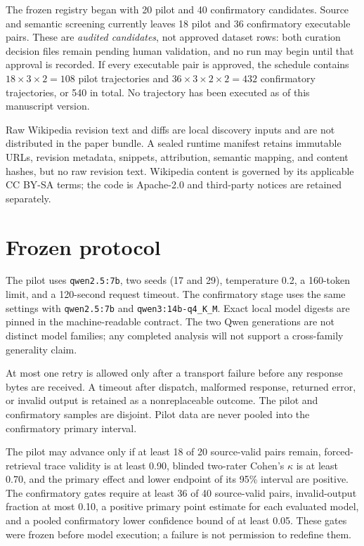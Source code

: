 \documentclass[11pt]{article}
\begin{document}
The frozen registry began with 20 pilot and 40 confirmatory candidates. Source and semantic screening currently leaves 18 pilot and 36 confirmatory executable pairs. These are \emph{audited candidates}, not approved dataset rows: both curation decision files remain pending human validation, and no run may begin until that approval is recorded. If every executable pair is approved, the schedule contains $18\times3\times2=108$ pilot trajectories and $36\times3\times2\times2=432$ confirmatory trajectories, or 540 in total. No trajectory has been executed as of this manuscript version.

Raw Wikipedia revision text and diffs are local discovery inputs and are not distributed in the paper bundle. A sealed runtime manifest retains immutable URLs, revision metadata, snippets, attribution, semantic mapping, and content hashes, but no raw revision text. Wikipedia content is governed by its applicable CC BY-SA terms; the code is Apache-2.0 and third-party notices are retained separately.

\section{Frozen protocol}

The pilot uses \texttt{qwen2.5:7b}, two seeds (17 and 29), temperature 0.2, a 160-token limit, and a 120-second request timeout. The confirmatory stage uses the same settings with \texttt{qwen2.5:7b} and \texttt{qwen3:14b-q4\_K\_M}. Exact local model digests are pinned in the machine-readable contract. The two Qwen generations are not distinct model families; any completed analysis will not support a cross-family generality claim.

At most one retry is allowed only after a transport failure before any response bytes are received. A timeout after dispatch, malformed response, returned error, or invalid output is retained as a nonreplaceable outcome. The pilot and confirmatory samples are disjoint. Pilot data are never pooled into the confirmatory primary interval.

The pilot may advance only if at least 18 of 20 source-valid pairs remain, forced-retrieval trace validity is at least 0.90, blinded two-rater Cohen's $\kappa$ is at least 0.70, and the primary effect and lower endpoint of its 95\% interval are positive. The confirmatory gates require at least 36 of 40 source-valid pairs, invalid-output fraction at most 0.10, a positive primary point estimate for each evaluated model, and a pooled confirmatory lower confidence bound of at least 0.05. These gates were frozen before model execution; a failure is not permission to redefine them.
\end{document}
